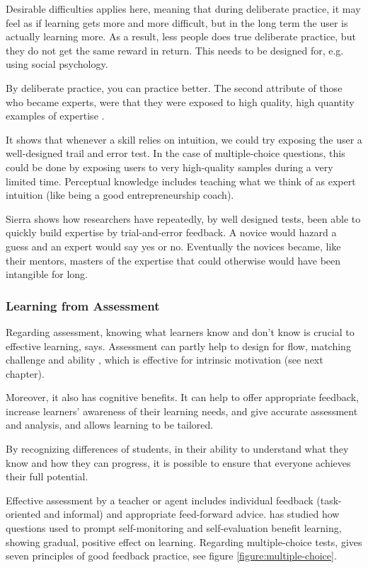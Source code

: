   Desirable difficulties applies here, meaning that during deliberate practice, it may feel as if learning gets more and more difficult, but in the long term the user is actually learning more. As a result, less people does true deliberate practice, but they do not get the same reward in return. This needs to be designed for, e.g. using social psychology.

  By deliberate practice, you can practice better. The second attribute of those who became experts, were that they were exposed to high quality, high quantity examples of expertise \citep{sierra}.

  It shows that whenever a skill relies on intuition, we could try exposing the user a well-designed trail and error test. In the case of multiple-choice questions, this could be done by exposing users to very high-quality samples during a very limited time. Perceptual knowledge includes teaching what we think of as expert intuition (like being a good entrepreneurship coach).

  Sierra shows how researchers have repeatedly, by well designed tests, been able to quickly build expertise by trial-and-error feedback. A novice would hazard a guess and an expert would say yes or no. Eventually the novices became, like their mentors, masters of the expertise that could otherwise would have been intangible for long.

  \subsubsection{Learning from Assessment}\label{learning-assessment}

  Regarding assessment, knowing what learners know and don't know is crucial to effective learning, \cite{luckin} says. Assessment can partly help to design for flow, matching challenge and ability \citep{bruhlmann}, which is effective for intrinsic motivation (see next chapter).

  Moreover, it also has cognitive benefits. It can help to offer appropriate feedback, increase learners' awareness of their learning needs, and give accurate assessment and analysis, and allows learning to be tailored.

  By recognizing differences of students, in their ability to understand what they know and how they can progress, it is possible to ensure that everyone achieves their full potential.

  Effective assessment by a teacher or agent includes individual feedback (task-oriented and informal) and appropriate feed-forward advice. \cite{sitzmann} has studied how questions used to prompt self-monitoring and self-evaluation benefit learning, showing gradual, positive effect on learning. Regarding multiple-choice tests, \cite{nicol} gives seven principles of good feedback practice, see figure \ref{figure:multiple-choice}.


